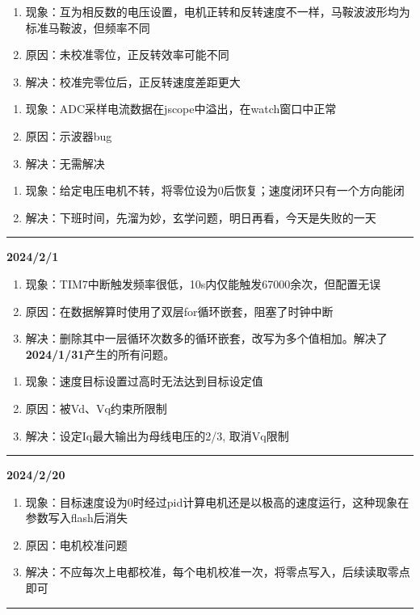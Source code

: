 \documentclass[main.tex]{subfiles}
\begin{document}
\begin{enumerate}
    \item 现象：互为相反数的电压设置，电机正转和反转速度不一样，马鞍波波形均为标准马鞍波，但频率不同
    \item 原因：未校准零位，正反转效率可能不同
    \item 解决：校准完零位后，正反转速度差距更大\\
\end{enumerate}

\begin{enumerate}
    \item 现象：ADC采样电流数据在jscope中溢出，在watch窗口中正常
    \item 原因：示波器bug
    \item 解决：无需解决\\
\end{enumerate}

\begin{enumerate}
    \item 现象：给定电压电机不转，将零位设为0后恢复；速度闭环只有一个方向能闭
    \item 解决：下班时间，先溜为妙，玄学问题，明日再看，今天是失败的一天
\end{enumerate}
\rule{\linewidth}{0.3pt}

\textbf{2024/2/1}
\begin{enumerate}
    \item 现象：TIM7中断触发频率很低，10s内仅能触发67000余次，但配置无误
    \item 原因：在数据解算时使用了双层for循环嵌套，阻塞了时钟中断
    \item 解决：删除其中一层循环次数多的循环嵌套，改写为多个值相加。解决了\textbf{2024/1/31}产生的所有问题。\\
\end{enumerate}

\begin{enumerate}
    \item 现象：速度目标设置过高时无法达到目标设定值
    \item 原因：被Vd、Vq约束所限制
    \item 解决：设定Iq最大输出为母线电压的2/3, 取消Vq限制
\end{enumerate}
\rule{\linewidth}{0.3pt}

\textbf{2024/2/20}
\begin{enumerate}
    \item 现象：目标速度设为0时经过pid计算电机还是以极高的速度运行，这种现象在参数写入flash后消失
    \item 原因：电机校准问题
    \item 解决：不应每次上电都校准，每个电机校准一次，将零点写入，后续读取零点即可
\end{enumerate}
\rule{\linewidth}{0.3pt}
\end{document}

